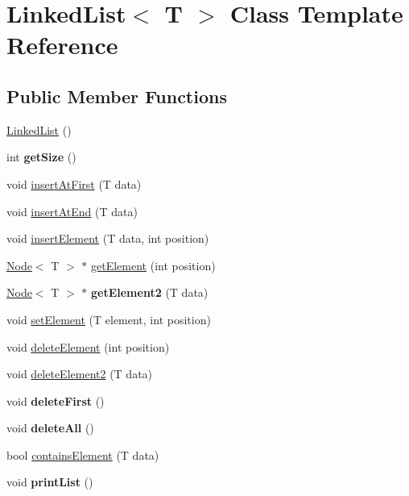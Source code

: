 \hypertarget{classLinkedList}{}\section{Linked\+List$<$ T $>$ Class Template Reference}
\label{classLinkedList}
\subsection*{Public Member Functions}
\begin{DoxyCompactItemize}
\item 
\hyperlink{classLinkedList_a3c20fcfec867e867f541061a09fc640c}{Linked\+List} ()
\item 
\mbox{\label{classLinkedList_ab56d59b74c8d24cd223a4a49a2b5cfb1}} 
int {\bfseries get\+Size} ()
\item 
void \hyperlink{classLinkedList_ab32c4f12170674c0193c94786655a981}{insert\+At\+First} (T data)
\item 
void \hyperlink{classLinkedList_a01734ecd86246df5d5c8e9b235b19a05}{insert\+At\+End} (T data)
\item 
void \hyperlink{classLinkedList_a7e21e5e9c204d433465d6e886f365e87}{insert\+Element} (T data, int position)
\item 
\hyperlink{classNode}{Node}$<$ T $>$ $\ast$ \hyperlink{classLinkedList_a6171fa1f4f2a8256f8e15248bcf43752}{get\+Element} (int position)
\item 
\mbox{\label{classLinkedList_aefe530c707b35d19ca421610feb56ebb}} 
\hyperlink{classNode}{Node}$<$ T $>$ $\ast$ {\bfseries get\+Element2} (T data)
\item 
void \hyperlink{classLinkedList_a910adb4391ffdbd8f1b9c62cd8e8f793}{set\+Element} (T element, int position)
\item 
void \hyperlink{classLinkedList_ac9ee137c10f202a1cdc2c9da0a685830}{delete\+Element} (int position)
\item 
void \hyperlink{classLinkedList_ac19ed825dc7942471971cdb0d652fd31}{delete\+Element2} (T data)
\item 
\mbox{\label{classLinkedList_afc8c97b11fc314a75d9798233bad8441}} 
void {\bfseries delete\+First} ()
\item 
\mbox{\label{classLinkedList_a8561a6603c5b4c5d178f81a202934cd2}} 
void {\bfseries delete\+All} ()
\item 
bool \hyperlink{classLinkedList_a169be5df3e72b1218f8cfdaf2237ac8f}{contains\+Element} (T data)
\item 
\mbox{\label{classLinkedList_af360d4c51f63b7756ac555efbfd5d4b6}} 
void {\bfseries print\+List} ()
\end{DoxyCompactItemize}


